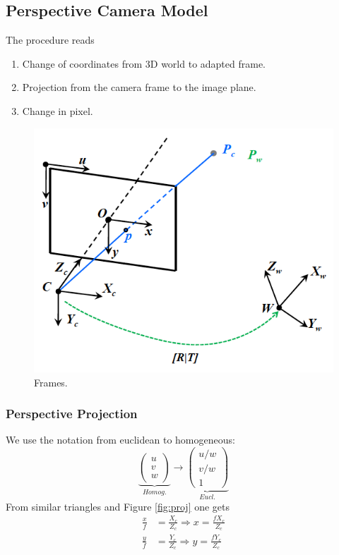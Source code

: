 \documentclass[a4paper,12 pt]{article}
\theoremstyle{definition}
\theoremstyle{remark}
\theoremstyle{definition}
\theoremstyle{definition}
\theoremstyle{definition}
\theoremstyle{remark}
\theoremstyle{definition}
\begin{document}
\subsection*{Perspective Camera Model}
The procedure reads
\begin{enumerate}
\item Change of coordinates from 3D world to adapted frame.
\item Projection from the camera frame to the image plane.
\item Change in pixel.
\end{enumerate}
\begin{figure}[h!]
\begin{center}
\includegraphics[scale=0.5]{pics/perspective}
\caption{Frames. \label{fig:perspective}}
\end{center}
\end{figure}
\subsubsection*{Perspective Projection}
We use the notation from euclidean to homogeneous:
\begin{equation}
\underbrace{\begin{pmatrix}
u \\
v\\
w
\end{pmatrix}}_{Homog.}\rightarrow 
\underbrace{\begin{pmatrix}
u/w \\
v/w\\
1
\end{pmatrix}}_{Eucl.}
\end{equation}
From similar triangles and Figure \ref{fig:proj} one gets
\begin{equation}
\begin{split}
\frac{x}{f}&=\frac{X_c}{Z_c} \Rightarrow x=\frac{fX_c}{Z_c}\\
\frac{y}{f}&=\frac{Y_c}{Z_c} \Rightarrow y=\frac{fY_c}{Z_c}
\end{split}
\end{equation}
\end{document}
